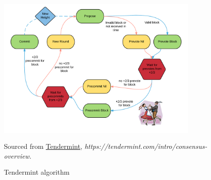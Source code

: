 
\begin{figure}[H]
  \centering
  \includegraphics[width = 10cm]{images/tendermint_consensus.png} \\
  \caption{
    Tendermint algorithm
  }{
    Sourced from \href{https://tendermint.com/intro/consensus-overview}{Tendermint}, \textit{https://tendermint.com/intro/consensus-overview}.
  }
  \label{figure:tendermint_algorithm}
\end{figure}
